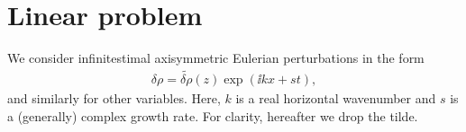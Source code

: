 \section{Linear problem}
We consider infinitestimal axisymmetric Eulerian perturbations in the
form \begin{align}
  \delta \rho= \widetilde{\delta \rho}(z)\exp{\left(\ii kx +
    s t\right)},  
\end{align}
and similarly for other variables. Here, $k$ 
is a real horizontal wavenumber and $s$ is a (generally) complex
growth rate. 
For clarity, hereafter we drop the tilde.  

